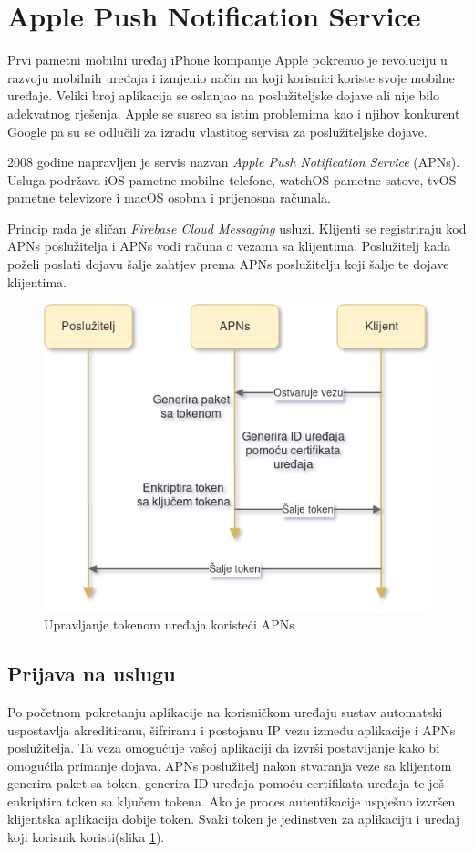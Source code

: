 \documentclass[times, utf8, zavrsni]{fer}
\begin{document}
\section{Apple Push Notification Service}

Prvi pametni mobilni uređaj iPhone kompanije Apple pokrenuo je revoluciju u razvoju mobilnih uređaja i izmjenio način na koji korisnici koriste svoje mobilne uređaje. Veliki broj aplikacija se oslanjao na poslužiteljske dojave ali nije bilo adekvatnog rješenja. Apple se susreo sa istim problemima kao i njihov konkurent Google pa su se odlučili za izradu vlastitog servisa za poslužiteljske dojave.

2008 godine napravljen je servis nazvan {\em Apple Push Notification Service} (APNs). Usluga podržava iOS pametne mobilne telefone, watchOS pametne satove, tvOS pametne televizore i macOS osobna i prijenosna računala.

Princip rada je sličan {\em Firebase Cloud Messaging} usluzi. Klijenti se registriraju kod APNs poslužitelja i APNs vodi računa o vezama sa klijentima. Poslužitelj kada poželi poslati dojavu šalje zahtjev prema APNs poslužitelju koji šalje te dojave klijentima.

\begin{figure}[htb]
\centering
\includegraphics[width=14cm]{img/apns.png}
\caption{Upravljanje tokenom uređaja koristeći APNs}
\label{fig:apns-image}
\end{figure}

\subsection{Prijava na uslugu}
Po početnom pokretanju aplikacije na korisničkom uređaju sustav automatski uspostavlja akreditiranu, šifriranu i postojanu IP vezu između aplikacije i APNs poslužitelja. Ta veza omogućuje vašoj aplikaciji da izvrši postavljanje kako bi omogućila primanje dojava. APNs poslužitelj nakon stvaranja veze sa klijentom generira paket sa token, generira ID uređaja pomoću certifikata uređaja te još enkriptira token sa ključem tokena. Ako je proces autentikacije uspješno izvršen klijentska aplikacija dobije token. Svaki token je jedinstven za aplikaciju i uređaj koji korisnik koristi(slika \ref{fig:apns-image}).
\end{document}
